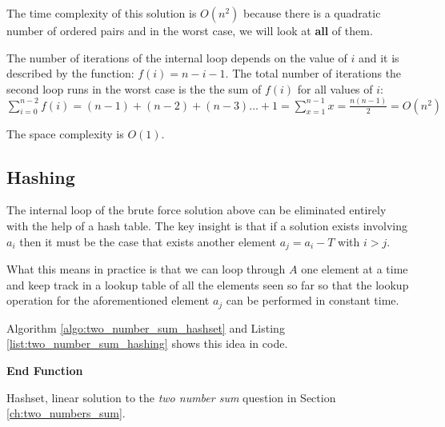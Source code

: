 

The time complexity of this solution is $O(n^2)$ because there is a quadratic number of
ordered pairs and in the worst case, we will look at \textbf{all} of them.

The number of iterations of the internal loop depends on the value of $i$ and
it is described by the function: $f(i) = n-i-1$. The total number of iterations the second
loop runs in the worst case is the the sum of $f(i)$ for all values of $i$: 
$\sum_{i=0}^{n-2} f(i) = (n-1) + (n-2) + (n-3) \ldots + 1 =\sum_{x=1}^{n-1} x= \frac{n(n-1)}{2} = O(n^2)$

The space complexity is $O(1)$.



\subsection{Hashing}
\label{sec:two_numbers:hashing}
The internal loop of the brute force solution above can be eliminated entirely with the help of a hash table.
The key insight is that if a solution exists involving $a_i$ then it must be the case that  exists another element $a_j  = a_i-T$ with $i > j$. 

What this means in practice is that we can loop through $A$ one element at a time and keep track in a lookup table of all the elements seen so far so that the lookup operation for the aforementioned element $a_j$ can be performed in constant time.

Algorithm \ref{algo:two_number_sum_hashset} and Listing \ref{list:two_number_sum_hashing} shows this idea in code.

\begin{algorithm}
	   
	
    \textbf{End Function}

		\caption{Hashset, linear solution to the \textit{two number sum} question in Section
		\ref{ch:two_numbers_sum}.}
		\label{algo:two_number_sum_hashset}
\end{algorithm}


